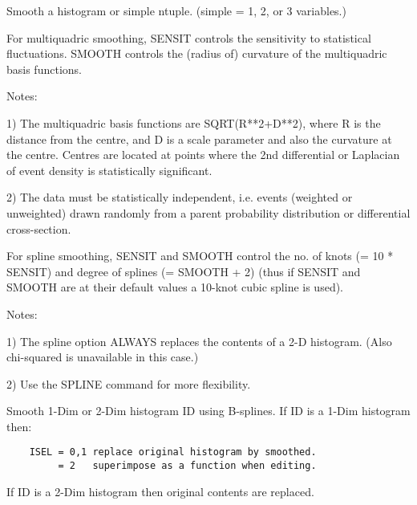    \par
Smooth a histogram or \DQUOTE{}simple\DQUOTE{} ntuple.  
   (\DQUOTE{}simple\DQUOTE{} = 1, 2, or 3 variables.) 

   \par
For multiquadric smoothing, SENSIT controls the sensitivity to statistical 
   fluctuations.  SMOOTH controls the (radius of) curvature of the 
   multiquadric basis functions.  

   \par
Notes:  

   \par
1) The multiquadric basis functions are SQRT(R**2+D**2), where R is the 
   distance from the \DQUOTE{}centre\DQUOTE{}, and D is a scale parameter and 
   also the curvature at the \DQUOTE{}centre\DQUOTE{}.  
   \DQUOTE{}Centres\DQUOTE{} are located at points where the 2nd differential 
   or Laplacian of event density is statistically significant.  

   \par
2) The data must be statistically independent, i.e. events (weighted or 
   unweighted) drawn randomly from a parent probability distribution or 
   differential cross-section.  

   \par
For spline smoothing, SENSIT and SMOOTH control the no. of knots (= 10 * 
   SENSIT) and degree of splines (= SMOOTH + 2) (thus if SENSIT and SMOOTH are 
   at their default values a 10-knot cubic spline is used).  

   \par
Notes:  

   \par
1) The spline option ALWAYS replaces the contents of a 2-D histogram.  
   (Also chi-squared is unavailable in this case.) 

   \par
2) Use the SPLINE command for more flexibility.  

\ENDCMD


\BEGARG
{}
\ENDARG

   \par
Smooth 1-Dim or 2-Dim histogram ID using B-splines.  If ID is a 1-Dim 
   histogram then:  
\begin{verbatim}
    ISEL = 0,1 replace original histogram by smoothed.
         = 2   superimpose as a function when editing.
\end{verbatim}
   \par
If ID is a 2-Dim histogram then original contents are replaced.  

